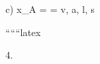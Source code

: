 c) \quad x_A = \frac{\phi - \phi_{\epsilon}}{\phi_{\beta} - \phi_{\epsilon}} \quad \phi = v, a, l, s

``````latex


4. \\